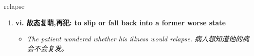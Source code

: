 
\begin{frame}
{\huge relapse}
\begin{center}
\begin{enumerate}\Large
  \item \textbf{vi. 故态复萌,再犯: to slip or fall back into a former worse state}
  \begin{itemize}
    \item \em{\Large{The patient wondered whether his illness would relapse. 病人想知道他的病会不会复发。}}
  \end{itemize}
\end{enumerate}
\end{center}
\end{frame}
